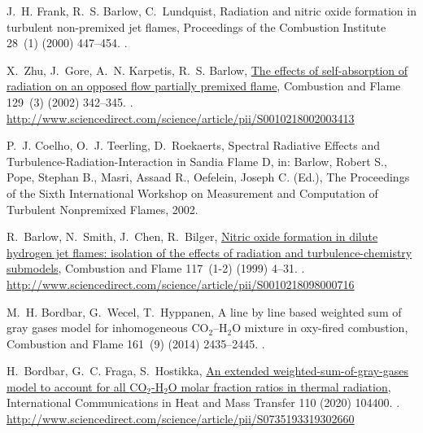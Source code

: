 \documentclass[preprint,12pt]{elsarticle}
\begin{document}
\begin{thebibliography}{10}
J.~H. Frank, R.~S. Barlow, C.~Lundquist, {Radiation and nitric oxide formation
  in turbulent non-premixed jet flames}, {Proceedings of the Combustion
  Institute} 28~(1) (2000) 447--454.
\newblock \href {http://dx.doi.org/10.1016/S0082-0784(00)80242-8}
  {}.

X.~Zhu, J.~Gore, A.~N. Karpetis, R.~S. Barlow,
  \href{http://www.sciencedirect.com/science/article/pii/S0010218002003413}{{The
  effects of self-absorption of radiation on an opposed flow partially premixed
  flame}}, {Combustion and Flame} 129~(3) (2002) 342--345.
\newblock \href {http://dx.doi.org/10.1016/S0010-2180(02)00341-3}
  {}.
\newline\urlprefix\url{http://www.sciencedirect.com/science/article/pii/S0010218002003413}

P.~J. Coelho, O.~J. Teerling, D.~Roekaerts, {Spectral Radiative Effects and
  Turbulence-Radiation-Interaction in Sandia Flame {D}}, in: {Barlow, Robert
  S., Pope, Stephan B., Masri, Assaad R., Oefelein, Joseph C.} (Ed.), {The
  Proceedings of the Sixth International Workshop on Measurement and
  Computation of Turbulent Nonpremixed Flames}, 2002.

R.~Barlow, N.~Smith, J.~Chen, R.~Bilger,
  \href{http://www.sciencedirect.com/science/article/pii/S0010218098000716}{{Nitric
  oxide formation in dilute hydrogen jet flames: isolation of the effects of
  radiation and turbulence-chemistry submodels}}, {Combustion and Flame}
  117~(1-2) (1999) 4--31.
\newblock \href {http://dx.doi.org/10.1016/S0010-2180(98)00071-6}
  {}.
\newline\urlprefix\url{http://www.sciencedirect.com/science/article/pii/S0010218098000716}

M.~H. Bordbar, G.~Wecel, T.~Hyppanen, {A line by line based weighted sum of
  gray gases model for inhomogeneous {CO$_2$–H$_2$O} mixture in oxy-fired
  combustion}, {Combustion and Flame} 161~(9) (2014) 2435--2445.
\newblock \href {http://dx.doi.org/10.1016/j.combustflame.2014.03.013}
  {}.

H.~Bordbar, G.~C. Fraga, S.~Hostikka,
  \href{http://www.sciencedirect.com/science/article/pii/S0735193319302660}{{An
  extended weighted-sum-of-gray-gases model to account for all {CO$_2$-H$_2$O}
  molar fraction ratios in thermal radiation}}, {International Communications
  in Heat and Mass Transfer} 110 (2020) 104400.
\newblock \href {http://dx.doi.org/10.1016/j.icheatmasstransfer.2019.104400}
  {}.
\newline\urlprefix\url{http://www.sciencedirect.com/science/article/pii/S0735193319302660}


\end{thebibliography}
\end{document}
